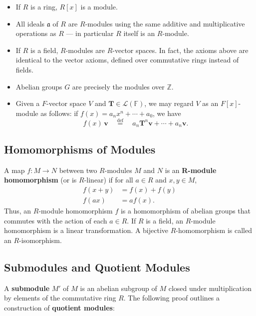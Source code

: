 \documentclass[11pt]{article}
\renewcommand{\vec}[1]{\mathbf{#1}}
\newcommand{\mat}[1]{\mathbf{#1}}
\begin{document}
\begin{itemize}
	\item If $R$ is a ring, $R[x]$ is a module.
	\item All ideals $\mathfrak{a}$ of $R$ are $R$-modules using the same additive and multiplicative operations as $R$ --- in particular $R$ itself is an $R$-module.
	\item If $R$ is a field, $R$-modules are $R$-vector spaces. In fact, the axioms above are identical to the vector axioms, defined over commutative rings instead of fields.
	\item Abelian groups $G$ are precisely the modules over $\mathbb{Z}$.
  \item Given a $F$-vector space $V$ and $\mat{T} \in \mathcal{L}(\mathbb{F})$, we may regard $V$ as an $F[x]$-module as follows: if $f(x) = a_{n}x^{n} + \cdots + a_{0}$, we have
  \[
    f(x) \, \vec{v} \quad \stackrel{\text{def}}{=} \quad  a_{n} \mat{T}^{n}\vec{v} + \cdots + a_{n} \vec{v}.
  \]
\end{itemize}


\subsection{Homomorphisms of Modules}

A map $f: M \to N$ between two $R$-modules $M$ and $N$ is an \textbf{R-module homomorphism} (or is $R$-linear) if for all $a \in R$ and $x, y \in M$,
\begin{align*}
	f(x + y) & = f(x) + f(y) \\
	f(ax)    & = a f(x).
\end{align*}
Thus, an $R$-module homomorphism $f$ is a homomorphism of abelian groups that commutes with the action of each $a \in R$. If $R$ is a field, an $R$-module homomorphism is a linear transformation. A bijective $R$-homomorphism is called an $R$-isomorphism.


\subsection{Submodules and Quotient Modules}

A \textbf{submodule} $M'$ of $M$ is an abelian subgroup of $M$ closed under multiplication by elements of the commutative ring $R$. The following proof outlines a construction of \textbf{quotient modules}:
\end{document}
